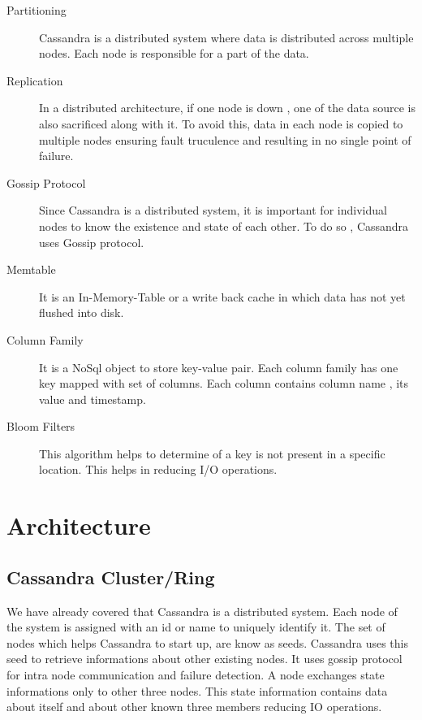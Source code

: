 \documentclass[9pt,twocolumn,twoside]{../../styles/osajnl}
\begin{document}
\begin{description}
  \item[Partitioning] \cite{www-dzone}Cassandra is a distributed system where data is distributed across multiple nodes. Each node is responsible for a part of the data.
  \item[Replication] \cite{www-dzone}In a distributed architecture, if one node is down , one of the data source is also sacrificed along with it. To avoid this, data in each node is copied to multiple nodes ensuring fault truculence and resulting in no single point of failure.
  \item[Gossip Protocol] \cite{wiki-gossip}Since Cassandra is a distributed system, it is important for individual nodes to know the existence and state of each other. To do so , Cassandra uses Gossip protocol.
  \item[Memtable] \cite{www-dzone}It is an In-Memory-Table or a write back cache in which data has not yet flushed into disk.
  \item[Column Family] \cite{wiki-columnfamily}It is a NoSql object to store key-value pair. Each column family has one key mapped with set of columns. Each column contains column name , its value and timestamp.
  \item[Bloom Filters] \cite{www-dzone}This algorithm helps to determine of a key is not present in a specific location. This helps in reducing I/O operations.
\end{description}

\section{Architecture}

\subsection{Cassandra Cluster/Ring}

We have already covered that Cassandra is a distributed system. Each node of the system is assigned with an id or name to uniquely identify it. The set of nodes which helps Cassandra to start up, are know as seeds. Cassandra uses this seed to retrieve informations about other existing nodes. It uses gossip protocol for intra node communication and failure detection. A node exchanges state informations only to other three nodes. This state information contains data about itself and about other known three members reducing IO operations.
\end{document}
